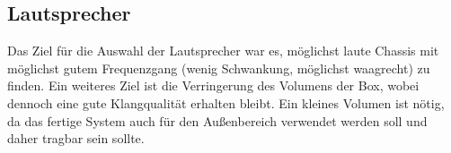\subsection{Lautsprecher}\label{subsec:2.1.2}
Das Ziel für die Auswahl der Lautsprecher war es, möglichst laute Chassis mit möglichst gutem Frequenzgang (wenig Schwankung, möglichst waagrecht) zu finden. Ein weiteres Ziel ist die Verringerung des Volumens der Box, wobei dennoch eine gute Klangqualität erhalten bleibt. Ein kleines Volumen ist nötig, da das fertige System auch für den Außenbereich verwendet werden soll und daher tragbar sein sollte. 